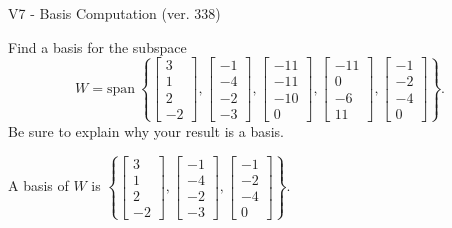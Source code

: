 \begin{exercise}
  \begin{exerciseTitle}V7 - Basis Computation (ver. 338)\end{exerciseTitle}
  \begin{exerciseStatement}
    Find a basis for the subspace 
\[W=\mathrm{span}\ \left\{\left[\begin{array}{r}
3 \\
1 \\
2 \\
-2
\end{array}\right] , \left[\begin{array}{r}
-1 \\
-4 \\
-2 \\
-3
\end{array}\right] , \left[\begin{array}{r}
-11 \\
-11 \\
-10 \\
0
\end{array}\right] , \left[\begin{array}{r}
-11 \\
0 \\
-6 \\
11
\end{array}\right] , \left[\begin{array}{r}
-1 \\
-2 \\
-4 \\
0
\end{array}\right]\right\}.\]
 Be sure to explain why your result is a basis.


  \end{exerciseStatement}
  \begin{exerciseAnswer}
   A basis of \(W\) is  \(\left\{\left[\begin{array}{r}
3 \\
1 \\
2 \\
-2
\end{array}\right] , \left[\begin{array}{r}
-1 \\
-4 \\
-2 \\
-3
\end{array}\right] , \left[\begin{array}{r}
-1 \\
-2 \\
-4 \\
0
\end{array}\right]\right\}\).
  


  \end{exerciseAnswer}
\end{exercise}
